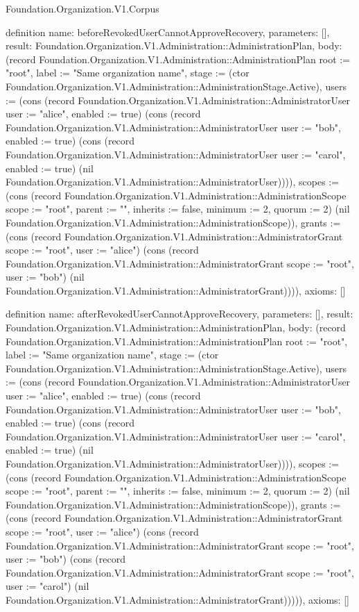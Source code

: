 \begin{lexlean}{Foundation.Organization.V1.Corpus}
\begin{semanticmodule}
definition{
  name: beforeRevokedUserCannotApproveRecovery,
  parameters: [],
  result: Foundation.Organization.V1.Administration::AdministrationPlan,
  body: (record Foundation.Organization.V1.Administration::AdministrationPlan {root := "root", label := "Same organization name", stage := (ctor Foundation.Organization.V1.Administration::AdministrationStage.Active), users := (cons (record Foundation.Organization.V1.Administration::AdministratorUser {user := "alice", enabled := true}) (cons (record Foundation.Organization.V1.Administration::AdministratorUser {user := "bob", enabled := true}) (cons (record Foundation.Organization.V1.Administration::AdministratorUser {user := "carol", enabled := true}) (nil Foundation.Organization.V1.Administration::AdministratorUser)))), scopes := (cons (record Foundation.Organization.V1.Administration::AdministrationScope {scope := "root", parent := "", inherits := false, minimum := 2, quorum := 2}) (nil Foundation.Organization.V1.Administration::AdministrationScope)), grants := (cons (record Foundation.Organization.V1.Administration::AdministratorGrant {scope := "root", user := "alice"}) (cons (record Foundation.Organization.V1.Administration::AdministratorGrant {scope := "root", user := "bob"}) (nil Foundation.Organization.V1.Administration::AdministratorGrant)))}),
  axioms: []
}

definition{
  name: afterRevokedUserCannotApproveRecovery,
  parameters: [],
  result: Foundation.Organization.V1.Administration::AdministrationPlan,
  body: (record Foundation.Organization.V1.Administration::AdministrationPlan {root := "root", label := "Same organization name", stage := (ctor Foundation.Organization.V1.Administration::AdministrationStage.Active), users := (cons (record Foundation.Organization.V1.Administration::AdministratorUser {user := "alice", enabled := true}) (cons (record Foundation.Organization.V1.Administration::AdministratorUser {user := "bob", enabled := true}) (cons (record Foundation.Organization.V1.Administration::AdministratorUser {user := "carol", enabled := true}) (nil Foundation.Organization.V1.Administration::AdministratorUser)))), scopes := (cons (record Foundation.Organization.V1.Administration::AdministrationScope {scope := "root", parent := "", inherits := false, minimum := 2, quorum := 2}) (nil Foundation.Organization.V1.Administration::AdministrationScope)), grants := (cons (record Foundation.Organization.V1.Administration::AdministratorGrant {scope := "root", user := "alice"}) (cons (record Foundation.Organization.V1.Administration::AdministratorGrant {scope := "root", user := "bob"}) (cons (record Foundation.Organization.V1.Administration::AdministratorGrant {scope := "root", user := "carol"}) (nil Foundation.Organization.V1.Administration::AdministratorGrant))))}),
  axioms: []
}


\end{semanticmodule}
\end{lexlean}
